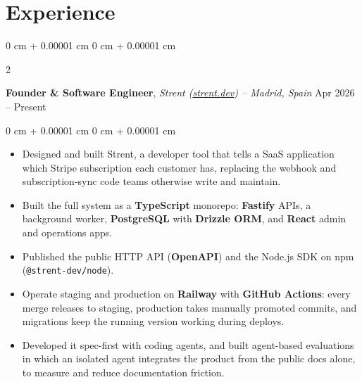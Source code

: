 \documentclass[10pt, letterpaper]{article}
\newenvironment{highlights}{
    \begin{itemize}[
        topsep=0.10 cm,
        parsep=0.10 cm,
        partopsep=0pt,
        itemsep=0pt,
        leftmargin=0 cm + 10pt
    ]
}{
    \end{itemize}
} %
\newenvironment{onecolentry}{
    \begin{adjustwidth}{
        0 cm + 0.00001 cm
    }{
        0 cm + 0.00001 cm
    }
}{
    \end{adjustwidth}
} %
\newenvironment{twocolentry}[2][]{
    \onecolentry
    \def\secondColumn{#2}
    \setcolumnwidth{\fill, 4.5 cm}
    \begin{paracol}{2}
}{
    \switchcolumn \raggedleft \secondColumn
    \end{paracol}
    \endonecolentry
} %
\begin{document}

    \vspace{0.1 cm}

    \section{Experience}


        \vspace{0.1 cm}


        \begin{twocolentry}{
            Apr 2026 – Present
        }
            \textbf{Founder \& Software Engineer}, \textit{Strent (\href{https://strent.dev}{strent.dev}) -- Madrid, Spain} \end{twocolentry}

        \vspace{0.10 cm}
        \begin{onecolentry}
            \begin{highlights}
                \item Designed and built Strent, a developer tool that tells a SaaS application which Stripe subscription each customer has, replacing the webhook and subscription-sync code teams otherwise write and maintain.
                \item Built the full system as a \textbf{TypeScript} monorepo: \textbf{Fastify} APIs, a background worker, \textbf{PostgreSQL} with \textbf{Drizzle ORM}, and \textbf{React} admin and operations apps.
                \item Published the public HTTP API (\textbf{OpenAPI}) and the Node.js SDK on npm (\texttt{@strent-dev/node}).
                \item Operate staging and production on \textbf{Railway} with \textbf{GitHub Actions}: every merge releases to staging, production takes manually promoted commits, and migrations keep the running version working during deploys.
                \item Developed it spec-first with coding agents, and built agent-based evaluations in which an isolated agent integrates the product from the public docs alone, to measure and reduce documentation friction.
            \end{highlights}
        \end{onecolentry}
\end{document}
